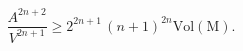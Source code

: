 \begin{equation}
\frac{A^{2n+2}}{V^{2n+1}} \ge 2^{2n+1}\,(n+1)^{2n}
{\mathrm{Vol{(M)}}}\label{Eguhidim}.
\end{equation}

